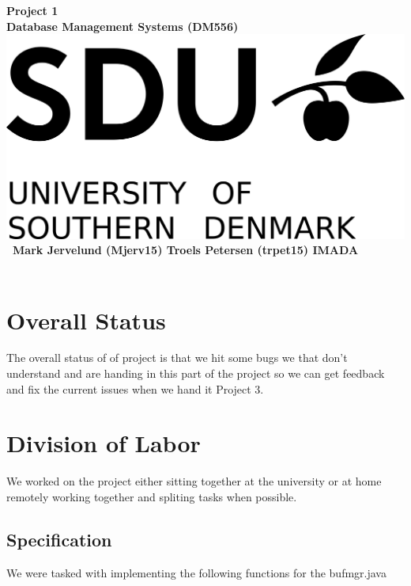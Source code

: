 \documentclass[a4paper,10pt,titlepage]{report}
\date{}
\begin{document}
\begin{titlepage}
\centering
    \vspace*{9\baselineskip}
    \huge
    \bfseries
    Project 1\\
    
    \normalfont 
	\huge    
    Database Management Systems (DM556)  \\[4\baselineskip]
    \normalfont
	\includegraphics[scale=1.5]{SDU_Logo}
    \vfill\ 
    Mark Jervelund (Mjerv15) Troels Petersen (trpet15)
    \vspace{5mm}
    IMADA \\
    \textbf{\datedate} \\[2\baselineskip]
\end{titlepage}

\setcounter{page}{1}
\renewcommand{\thepage}{\arabic{page}}

\lstset{language=Java}          %
\section{Overall Status}
The overall status of of project is that we hit some bugs we that don't understand and are handing in this part of the project so we can get feedback and fix the current issues when we hand it Project 3.
\section{Division of Labor}
We worked on the project either sitting together at the university or at home remotely working together and spliting tasks when possible.
\subsection{Specification}
We were tasked with implementing the following functions for the bufmgr.java\\
\end{document}
